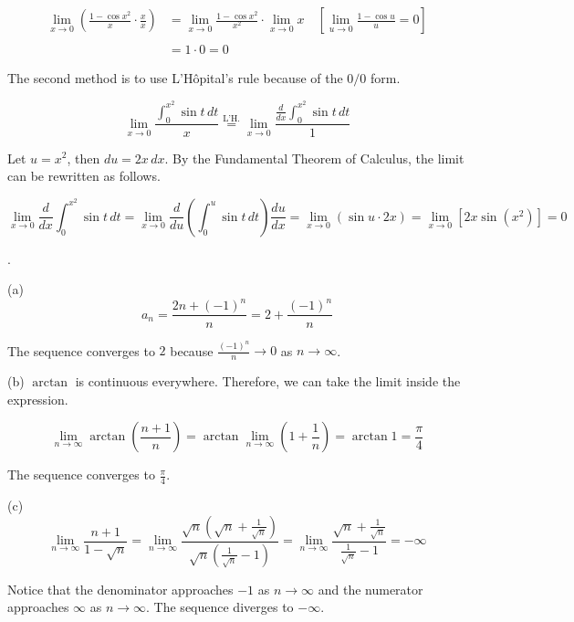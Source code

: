 \documentclass{article}
\begin{document}
\begin{align*}\lim_{x\to0}\left(\frac{1-\cos x^2}x\cdot\frac xx\right)&=\lim_{x\to0}\frac{1-\cos x^2}{x^2}\cdot\lim_{x\to0}x\quad\left[\lim_{u\to0}\frac{1-\cos u}u = 0\right]\\\\&=1\cdot0=\boxed0\end{align*}

\hfill

\noindent The second method is to use L'Hôpital's rule because of the $0/0$ form.

\[\lim_{x\to0}\frac{\displaystyle\int_0^{x^2}\sin t\,dt}x\overset{\text{L'H.}}{=}\lim_{x\to0}\frac{\displaystyle\frac d{dx}\int_0^{x^2}\sin t\,dt}1\]

\hfill

\noindent Let $u=x^2$, then $du=2x\,dx$. By the Fundamental Theorem of Calculus, the limit can be rewritten as follows.

\[\lim_{x\to0}\displaystyle\frac d{dx}\int_0^{x^2}\sin t\,dt=\lim_{x\to0}\frac d{du}\left(\int_0^u\sin t\,dt\right)\frac{du}{dx}=\lim_{x\to0}\left(\sin u\cdot 2x\right)=\lim_{x\to0}\left[2x\sin \left(x^2\right)\right]=\boxed0\]

\hfill

.

\hfill

\noindent (a)
\[a_n=\frac{2n+(-1)^n}{n}=2+\frac{(-1)^n}n\]

\hfill

\noindent The sequence converges to $\boxed2$ because $\displaystyle\frac{(-1)^n}n\to 0$ as $n\to\infty$.

\hfill

\noindent (b) $\arctan$ is continuous everywhere. Therefore, we can take the limit inside the expression.

\[\lim_{n\to\infty}\arctan\left(\frac{n+1}n\right)=\arctan\lim_{n\to\infty}\left(1+\frac1n\right)=\arctan1=\frac\pi4\]

\hfill

\noindent The sequence converges to $\displaystyle\boxed{\frac\pi4}$.

\hfill

\noindent (c)
\[\lim_{n\to\infty}\frac{n+1}{1-\sqrt n}=\lim_{n\to\infty}\frac{\sqrt n\left(\sqrt n+\frac1{\sqrt n}\right)}{\sqrt n\left(\frac1{\sqrt n}-1\right)}=\lim_{n\to\infty}\frac{\sqrt n+\frac1{\sqrt n}}{\frac1{\sqrt n}-1}=-\infty\]

\hfill

\noindent Notice that the denominator approaches $-1$ as $n\to\infty$ and the numerator approaches $\infty$ as $n\to\infty$. The sequence diverges to $\boxed{-\infty}$.
\end{document}

